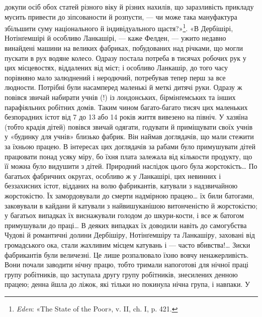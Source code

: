\parcont{}  %
докупи осіб обох статей різного віку й різних нахилів, що заразливість прикладу
мусить привести до зіпсованости й розпусти, — чи може така мануфактура збільшити
суму національного й індивідуального щастя?»\footnote{
\emph{Eden}: «The State of the Poor», v. II, ch. I, p. 421.
}. «В Дербішірі, Нотінґемшірі й особливо
Ланкашірі, — каже Фелден, — ужито недавно винайдені машини на великих фабриках,
побудованих над річками, що могли пускати в рух водяне колесо. Одразу постала
потреба в тисячах робочих рук у цих місцевостях, віддалених від міст; і особливо
Ланкашір, до того часу порівняно мало залюднений і неродючий, потребував тепер
перш за все людности. Потрібні були насамперед маленькі й меткі дитячі руки.
Одразу ж повівся звичай набирати учнів (!) із лондонських, бірмінґемських та
інших парафіяльних робітних домів. Таким чином багато-багато тисяч
цих маленьких безпорадних істот від 7 до 13 або 14 років життя вивезено на
північ. У хазяїна (тобто крадія дітей) повівся звичай одягати, годувати й
приміщувати своїх учнів у «будинку для учнів» близько фабрик. Він наймав
доглядачів, що мали стежити за їхньою працею. В інтересах цих доглядачів
за рабами було примушувати дітей працювати понад усяку міру, бо їхня плата
залежала від кількости продукту, що її можна було видушити
з дітей. Природний наслідок цього була жорстокість\dots{} По багатьох фабричних
округах, особливо ж у Ланкашірі, цих невинних і беззахисних істот, відданих на
волю фабрикантів, катували з надзвичайною жорстокістю. Їх замордовували до
смерти надмірною працею\dots{} їх били батогами, заковували в кайдани й
катували з найвишуканішою витонченістю й жорстокістю; у багатьох випадках їх
виснажували голодом до шкури-кости, і все ж батогом примушували до праці\dots{}
В деяких випадках їх доводили навіть до самогубства Чудові й романтичні
долини Дербішіру, Нотінґемшіру та Ланкашіру, заховані від
громадського ока, стали жахливим місцем катувань і — часто вбивства!\dots{}
Зиски фабрикантів були величезні. Це лише розпалювало їхню вовчу ненажерливість.
Вони почали заводити нічну працю, тобто тримали напоготові для нічної праці
групу робітників, що заступала другу групу робітників, знесилених денною працею;
денна йшла до ліжок, які тільки но покинула нічна група, і навпаки. У
